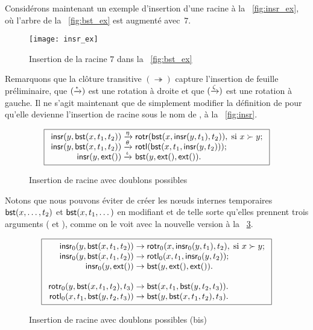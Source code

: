 Considérons maintenant un exemple d'insertion d'une racine à la
\fig~\vref{fig:insr_ex}, où l'arbre de la \fig~\vref{fig:bst_ex} est
augmenté avec~\(7\).
\begin{figure}
\centering
\texttt{[image: insr\_ex]}%
\caption{Insertion de la racine \(7\) dans la \fig~\vref{fig:bst_ex}}
\label{fig:insr_ex}
\end{figure}
Remarquons que la clôture transitive \((\twoheadrightarrow)\) capture
l'insertion de feuille préliminaire, que
\((\xrightarrow{\smash{\epsilon}})\) est une rotation à droite et que
\((\xrightarrow{\smash{\zeta}})\) est une rotation à gauche. Il ne
s'agit maintenant que de simplement modifier la définition de
 pour qu'elle devienne l'insertion de racine sous le nom
de , à la \fig~\vref{fig:insr}.
\begin{figure}
\begin{equation*}
\boxed{
\begin{array}{r@{\;}l@{\;}l}
\fun{insr}(y,\fun{bst}(x,t_1,t_2)) & \xrightarrow{\smash{\eta}} &
  \fun{rotr}(\fun{bst}(x,\fun{insr}(y,t_1),t_2)),
  \; \text{si \(x \succ y\)};\\
\fun{insr}(y,\fun{bst}(x,t_1,t_2)) & \xrightarrow{\smash{\theta}} &
  \fun{rotl}(\fun{bst}(x,t_1,\fun{insr}(y,t_2)));\\
\fun{insr}(y,\fun{ext}()) & \xrightarrow{\smash{\iota}} & \fun{bst}(y,\fun{ext}(),\fun{ext}()).
\end{array}}
\end{equation*}
\caption{Insertion de racine avec doublons possibles}
\label{fig:insr}
\end{figure}
Notons que nous pouvons éviter de créer les nœuds internes
temporaires \(\textsf{bst}(x,\dots,t_2)\) et \(\textsf{bst}(x,t_1,\dots)\)
en modifiant  et  de telle sorte qu'elles
prennent trois arguments ( et ),
comme on le voit avec la nouvelle version  à la
\fig~\ref{fig:insr0}.
\begin{figure}[b]
\begin{equation*}
\boxed{
\begin{array}{r@{\;}l@{\;}l}
\fun{insr}_0(y,\fun{bst}(x,t_1,t_2)) & \rightarrow &
  \fun{rotr}_0(x,\fun{insr}_0(y,t_1),t_2),
  \; \text{si \(x \succ y\)};\\
\fun{insr}_0(y,\fun{bst}(x,t_1,t_2)) & \rightarrow &
  \fun{rotl}_0(x,t_1,\fun{insr}_0(y,t_2));\\
\fun{insr}_0(y,\fun{ext}()) & \rightarrow &
\fun{bst}(y,\fun{ext}(),\fun{ext}()).\\
\\
\fun{rotr}_0(y,\fun{bst}(x,t_1,t_2),t_3)
& \rightarrow & \fun{bst}(x,t_1,\fun{bst}(y,t_2,t_3)).\\
\fun{rotl}_0(x,t_1,\fun{bst}(y,t_2,t_3))
& \rightarrow & \fun{bst}(y,\fun{bst}(x,t_1,t_2),t_3).
\end{array}}
\end{equation*}
\caption{Insertion de racine avec doublons possibles (bis)}
\label{fig:insr0}
\end{figure}

